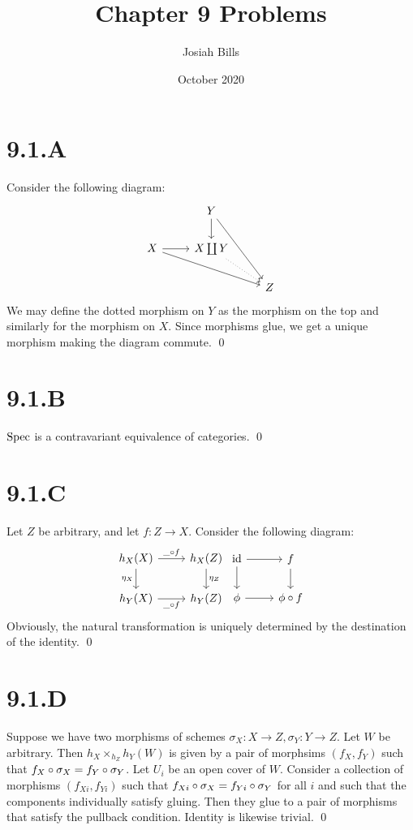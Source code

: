 \documentclass{article}
\title{Chapter 9 Problems}
\author{Josiah Bills}
\date{October 2020}
\begin{document}
\maketitle

\section{9.1.A}
Consider the following diagram:
\[
    \begin{tikzcd}
                          & Y \ar[d] \ar[ddr]               \\
        X \ar[r] \ar[rrd] & X \coprod Y \ar[dr, dotted]     \\
                          &                             & Z
    \end{tikzcd}
\]
We may define the dotted morphism on $Y$ as the morphism on the top and similarly for the morphism on $X$. Since morphisms glue, we get a unique morphism making the diagram commute. \qed

\section{9.1.B}
$\operatorname{Spec}$ is a contravariant equivalence of categories. \qed

\section{9.1.C}
Let $Z$ be arbitrary, and let $f: Z \to X$. Consider the following diagram:
\[
    \begin{tikzcd}
        h_X(X) \ar[d, "\eta_X", swap] \ar[r, "\_ \after f"] & h_X(Z)  \ar[d, "\eta_Z"] \\
        h_Y(X)                  \ar[r, "\_ \after f", swap] & h_Y(Z)
    \end{tikzcd}
    \begin{tikzcd}
        \text{id} \ar[d] \ar[r] & f \ar[d]      \\
        \phi             \ar[r] & \phi \after f
    \end{tikzcd}
\]
Obviously, the natural transformation is uniquely determined by the destination of the identity. \qed

\section{9.1.D}
Suppose we have two morphisms of schemes $\sigma_X: X \to Z, \sigma_Y: Y \to Z$. Let $W$ be arbitrary. Then $h_X \times_{h_Z} h_Y(W)$ is given by a pair of morphsims $(f_X, f_Y)$ such that $f_X \circ \sigma_X=f_Y \circ \sigma_Y$. Let $U_i$ be an open cover of $W$. Consider a collection of morphisms $(f_{Xi}, f_{Yi})$ such that $f_{Xi} \circ \sigma_X=f_{Yi} \circ \sigma_Y$ for all $i$ and such that the components individually satisfy gluing. Then they glue to a pair of morphisms that satisfy the pullback condition. Identity is likewise trivial. \qed
\end{document}
